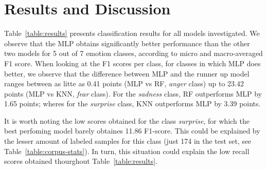\documentclass[11pt,a4paper]{article}
\begin{document}


\section{Results and Discussion}

Table~\ref{table:results} presents classification results for all models investigated. We observe that the MLP obtains significantly better performance than the other two models for 5 out of 7 emotion classes, according to micro and macro-averaged F1 score.
When looking at the F1 scores per class, for classes in which MLP does better, we observe that the difference between MLP and the runner up model ranges between as litte as 0.41 points (MLP vs RF, {\it anger} class) up to 23.42 points (MLP vs KNN, {\it fear} class).
For the {\it sadness} class, RF outperforms MLP by 1.65 points; wheres for the {\it surprise} class, KNN outperforms MLP by 3.39 points.

It is worth noting the low scores obtained for the class {\it surprise}, for which the best perfoming model barely obtaines 11.86 F1-score.
This could be explained by the lesser amount of labeled samples for this class (just 174 in the test set, see Table~\ref{table:corpus-stats}).
In turn, this situation could explain the low recall scores obtained thourghout Table~\ref{table:results}.
\end{document}
